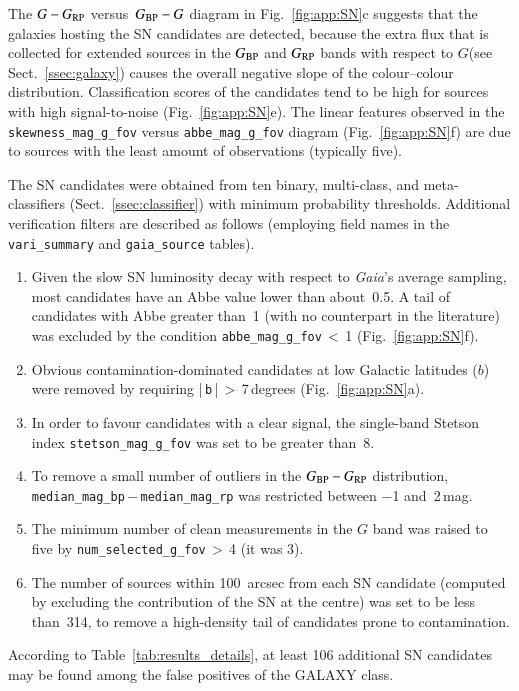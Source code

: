 \documentclass[longauth]{aa}
\def\gaia{\textit{Gaia}\xspace}
\def\g{$G$\xspace}
\def\bp{$G_{\rm BP}$\xspace}
\def\rp{$G_{\rm RP}$\xspace}
\def\bprp{\mbox{$G_{\rm BP}-G_{\rm RP}$}\xspace}
\def\bpg{\mbox{$G_{\rm BP}-G$}\xspace}
\def\grp{\mbox{$G-G_{\rm RP}$}\xspace}
\begin{document}
The \grp versus~\bpg diagram in Fig.~\ref{fig:app:SN}c suggests that the galaxies hosting the SN candidates are detected, because the extra flux that is collected for extended sources in the \bp and \rp bands with respect to \g (see Sect.~\ref{ssec:galaxy}) causes the overall negative slope of the colour--colour distribution.
Classification scores of the candidates tend to be high for sources with high signal-to-noise (Fig.~\ref{fig:app:SN}e).
The linear features observed in the \texttt{skewness\_mag\_g\_fov} versus \texttt{abbe\_mag\_g\_fov} diagram (Fig.~\ref{fig:app:SN}f) are due to sources with the least amount of observations (typically five).

The SN candidates were obtained from ten binary, multi-class, and meta-classifiers (Sect.~\ref{ssec:classifier}) with minimum probability thresholds. Additional verification filters are described as follows (employing field names in the \texttt{vari\_summary} and \texttt{gaia\_source} tables).
\begin{enumerate}
    \item Given the slow SN luminosity decay with respect to \gaia's average sampling, most candidates have an Abbe value lower than about~0.5. A tail of candidates with Abbe  greater than~1 (with no counterpart in the literature) was excluded by the condition \texttt{abbe\_mag\_g\_fov}\,$<$\,1 (Fig.~\ref{fig:app:SN}f).
    \item Obvious contamination-dominated candidates at low Galactic latitudes ($b$) were removed by requiring |\,\texttt{b}\,|\,$>$\,7\,degrees (Fig.~\ref{fig:app:SN}a). 
    \item In order to favour candidates with a clear signal, the single-band Stetson index \texttt{stetson\_mag\_g\_fov} was set to be greater than~8. 
    \item To remove a small number of outliers in the \bprp distribution, \texttt{median\_mag\_bp}\,$-$\,\texttt{median\_mag\_rp} was restricted between $-$1 and~2\,mag.
    \item The minimum number of clean measurements in the \g band was raised to five by \texttt{num\_selected\_g\_fov}\,$>$\,4 (it was 3). 
    \item The number of sources within 100~arcsec from each SN candidate (computed by excluding the contribution of the SN at the centre) was set to be less than~314, to remove a high-density tail of candidates prone to  contamination.
\end{enumerate}
    
According to Table~\ref{tab:results_details}, at least 106 additional SN candidates may be found among the false positives of the GALAXY class.
\end{document}
